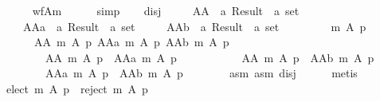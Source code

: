 \begin{isabellebody}
\ \ \ \ \isamarkupfalse%
\ wf{\isacharunderscore}{\kern0pt}A{\isacharunderscore}{\kern0pt}m{\isacharunderscore}{\kern0pt}{}\isanewline
\ \ \ \ \isamarkupfalse%
\ simp\isanewline
\ \ \isamarkupfalse%
\ disj{}\ \isamarkupfalse%
\isanewline
\ \ \ \ AA\ {\isacharcolon}{\kern0pt}{\isacharcolon}{\kern0pt}\ {\isachardoublequoteopen}{\isacharprime}{\kern0pt}a\ Result\ {\isasymRightarrow}\ {\isacharprime}{\kern0pt}a\ set{\isachardoublequoteclose}\ \isanewline
\ \ \ \ AAa\ {\isacharcolon}{\kern0pt}{\isacharcolon}{\kern0pt}\ {\isachardoublequoteopen}{\isacharprime}{\kern0pt}a\ Result\ {\isasymRightarrow}\ {\isacharprime}{\kern0pt}a\ set{\isachardoublequoteclose}\ \isanewline
\ \ \ \ AAb\ {\isacharcolon}{\kern0pt}{\isacharcolon}{\kern0pt}\ {\isachardoublequoteopen}{\isacharprime}{\kern0pt}a\ Result\ {\isasymRightarrow}\ {\isacharprime}{\kern0pt}a\ set{\isachardoublequoteclose}\isanewline
\ \ \ \ \isanewline
\ \ \ \ {\isachardoublequoteopen}m\ A\ p\ {\isacharequal}{\kern0pt}\isanewline
\ \ \ \ \ \ {\isacharparenleft}{\kern0pt}AA\ {\isacharparenleft}{\kern0pt}m\ A\ p{\isacharparenright}{\kern0pt}{\isacharcomma}{\kern0pt}\ AAa\ {\isacharparenleft}{\kern0pt}m\ A\ p{\isacharparenright}{\kern0pt}{\isacharcomma}{\kern0pt}\ AAb\ {\isacharparenleft}{\kern0pt}m\ A\ p{\isacharparenright}{\kern0pt}{\isacharparenright}{\kern0pt}\ {\isasymand}\isanewline
\ \ \ \ \ \ \ \ AA\ {\isacharparenleft}{\kern0pt}m\ A\ p{\isacharparenright}{\kern0pt}\ {\isasyminter}\ AAa\ {\isacharparenleft}{\kern0pt}m\ A\ p{\isacharparenright}{\kern0pt}\ {\isacharequal}{\kern0pt}\ {\isacharbraceleft}{\kern0pt}{\isacharbraceright}{\kern0pt}\ {\isasymand}\isanewline
\ \ \ \ \ \ \ \ AA\ {\isacharparenleft}{\kern0pt}m\ A\ p{\isacharparenright}{\kern0pt}\ {\isasyminter}\ AAb\ {\isacharparenleft}{\kern0pt}m\ A\ p{\isacharparenright}{\kern0pt}\ {\isacharequal}{\kern0pt}\ {\isacharbraceleft}{\kern0pt}{\isacharbraceright}{\kern0pt}\ {\isasymand}\isanewline
\ \ \ \ \ \ \ \ AAa\ {\isacharparenleft}{\kern0pt}m\ A\ p{\isacharparenright}{\kern0pt}\ {\isasyminter}\ AAb\ {\isacharparenleft}{\kern0pt}m\ A\ p{\isacharparenright}{\kern0pt}\ {\isacharequal}{\kern0pt}\ {\isacharbraceleft}{\kern0pt}{\isacharbraceright}{\kern0pt}{\isachardoublequoteclose}\isanewline
\ \ \ \ \isamarkupfalse%
\ asm{}\ asm{}\ disj\isanewline
\ \ \ \ \isamarkupfalse%
\ metis\isanewline
\ \ \isamarkupfalse%
\ {\isachardoublequoteopen}{\isacharparenleft}{\kern0pt}{\isacharparenleft}{\kern0pt}elect\ m\ A\ p{\isacharparenright}{\kern0pt}\ {\isasyminter}\ {\isacharparenleft}{\kern0pt}reject\ m\ A\ p{\isacharparenright}{\kern0pt}\ {\isacharequal}{\kern0pt}\ {\isacharbraceleft}{\kern0pt}{\isacharbraceright}{\kern0pt}{\isacharparenright}{\kern0pt}\ {\isasymand}\isanewline

\end{isabellebody}
